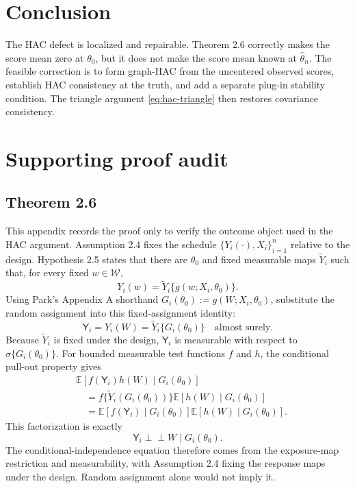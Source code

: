 \documentclass[11pt]{article}
\newcommand{\E}{\mathbb E}
\newcommand{\indep}{\mathrel{\perp\!\!\!\perp}}
\begin{document}
\section*{Conclusion}

The HAC defect is localized and repairable. Theorem 2.6 correctly makes the
score mean zero at \(\theta_0\), but it does not make the score mean known at
\(\widehat\theta_n\). The feasible correction is to form graph-HAC from the
uncentered observed scores, establish HAC consistency at the truth, and add a
separate plug-in stability condition. The triangle argument
\eqref{eq:hac-triangle} then restores covariance consistency.

\appendix

\section{Supporting proof audit}

\subsection{Theorem 2.6}

This appendix records the proof only to verify the outcome object used in the
HAC argument. Assumption 2.4 fixes the schedule
\(\{Y_i(\cdot),X_i\}_{i=1}^n\) relative to the design. Hypothesis 2.5 states
that there are \(\theta_0\) and fixed measurable maps \(\widetilde Y_i\) such
that, for every fixed \(w\in\mathcal W\),
\[
 Y_i(w)=\widetilde Y_i\{g(w;X_i,\theta_0)\}.
\]
Using Park's Appendix A shorthand
\(G_i(\theta_0):=g(W;X_i,\theta_0)\), substitute the random assignment into
this fixed-assignment identity:
\begin{equation}
 \mathsf{Y}_i=Y_i(W)
 =\widetilde Y_i\{G_i(\theta_0)\}
 \quad\text{almost surely}.
 \label{eq:appendix-measurability}
\end{equation}
Because \(\widetilde Y_i\) is fixed under the design, \(\mathsf{Y}_i\) is
measurable with respect to \(\sigma\{G_i(\theta_0)\}\). For bounded measurable
test functions \(f\) and \(h\), the conditional pull-out property gives
\begin{align}
 &\E[f(\mathsf{Y}_i)h(W)\mid G_i(\theta_0)] \\
 &\quad=f\{\widetilde Y_i(G_i(\theta_0))\}
       \E[h(W)\mid G_i(\theta_0)] \\
 &\quad=\E[f(\mathsf{Y}_i)\mid G_i(\theta_0)]
       \E[h(W)\mid G_i(\theta_0)].
\end{align}
This factorization is exactly
\[
 \mathsf{Y}_i\indep W\mid G_i(\theta_0).
\]
The conditional-independence equation therefore comes from the exposure-map
restriction and measurability, with Assumption 2.4 fixing the response maps
under the design. Random assignment alone would not imply it.
\end{document}
